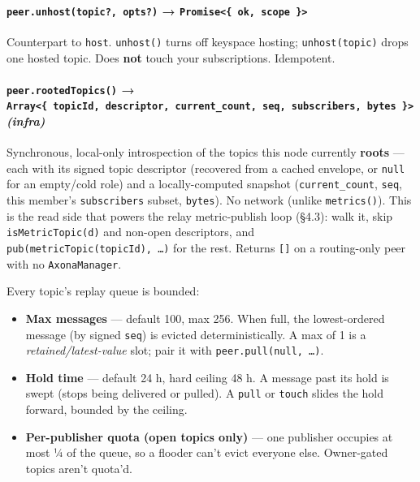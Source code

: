 \documentclass[
  nobib]{tufte-handout}
\providecommand{\tightlist}{%
  \setlength{\itemsep}{0pt}\setlength{\parskip}{0pt}}
\renewcommand{\subsubsection}[1]{\medskip\par\noindent{\normalsize\bfseries #1}\par\nobreak\smallskip}
\begin{document}
\paragraph{\texorpdfstring{\texttt{peer.unhost(topic?,\ opts?)} →
\texttt{Promise\textless{}\{\ ok,\ scope\ \}\textgreater{}}}{peer.unhost(topic?, opts?) → Promise\textless\{ ok, scope \}\textgreater{}}}\label{peer.unhosttopic-opts-promise-ok-scope}

Counterpart to \texttt{host}. \texttt{unhost()} turns off keyspace
hosting; \texttt{unhost(topic)} drops one hosted topic. Does
\textbf{not} touch your subscriptions. Idempotent.

\paragraph{\texorpdfstring{\texttt{peer.rootedTopics()} →
\texttt{Array\textless{}\{\ topicId,\ descriptor,\ current\_count,\ seq,\ subscribers,\ bytes\ \}\textgreater{}}
\emph{(infra)}}{peer.rootedTopics() → Array\textless\{ topicId, descriptor, current\_count, seq, subscribers, bytes \}\textgreater{} (infra)}}\label{peer.rootedtopics-array-topicid-descriptor-current_count-seq-subscribers-bytes-infra}

Synchronous, local-only introspection of the topics this node currently
\textbf{roots} --- each with its signed topic descriptor (recovered from
a cached envelope, or \texttt{null} for an empty/cold role) and a
locally-computed snapshot (\texttt{current\_count}, \texttt{seq}, this
member's \texttt{subscribers} subset, \texttt{bytes}). No network
(unlike \texttt{metrics()}). This is the read side that powers the relay
metric-publish loop (§4.3): walk it, skip \texttt{isMetricTopic(d)} and
non-open descriptors, and \texttt{pub(metricTopic(topicId),\ …)} for the
rest. Returns \texttt{{[}{]}} on a routing-only peer with no
\texttt{AxonaManager}.

\subsubsection{4.6 topic limits}\label{topic-limits}

Every topic's replay queue is bounded:

\begin{itemize}
\tightlist
\item
  \textbf{Max messages} --- default 100, max 256. When full, the
  lowest-ordered message (by signed \texttt{seq}) is evicted
  deterministically. A max of 1 is a \emph{retained/latest-value} slot;
  pair it with \texttt{peer.pull(null,\ …)}.
\item
  \textbf{Hold time} --- default 24 h, hard ceiling 48 h. A message past
  its hold is swept (stops being delivered or pulled). A \texttt{pull}
  or \texttt{touch} slides the hold forward, bounded by the ceiling.
\item
  \textbf{Per-publisher quota (open topics only)} --- one publisher
  occupies at most ¼ of the queue, so a flooder can't evict everyone
  else. Owner-gated topics aren't quota'd.
\end{itemize}
\end{document}
